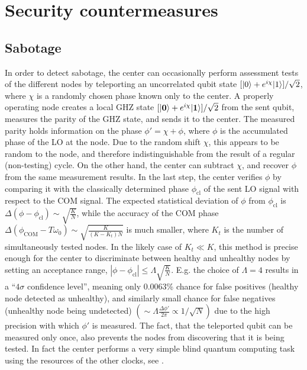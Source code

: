 




\section{Security countermeasures}
\label{app:Security_countermeasures}

\subsection{Sabotage}
In order to detect sabotage, the center can occasionally perform assessment
tests of the different nodes by teleporting an uncorrelated qubit state $[| 0 \rangle +
e^{i\chi}| 1 \rangle]/\sqrt{2}$, where $\chi$ is a
 randomly chosen phase known only to the center.
A properly operating node creates a local GHZ state $[| \mathbf{0} \rangle +
e^{i\chi}| \mathbf{1} \rangle]/\sqrt{2}$ from the sent qubit,
 measures the parity of the GHZ state, and sends it to the center. The
measured parity holds information on the phase $\phi' = \chi + \phi$, where
$\phi$ is the accumulated phase of the LO at the node. Due to the random shift
$\chi$, this appears to be random to the node, and therefore indistinguishable
from the result of a regular (non-testing) cycle. On the other hand, the center
can subtract $\chi$, and recover $\phi$ from the same measurement results. In
the last step, the center verifies $\phi$ by comparing it with the classically
determined phase $\phi_\mathrm{cl}$ of the sent LO signal with respect to the COM
signal. The expected statistical deviation of
$\phi$ from $\phi_\mathrm{cl}$ is $\Delta(\phi -
\phi_\mathrm{cl})\sim\sqrt{\frac{K}{N}}$, while the accuracy of the COM phase
$\Delta(\phi_\mathrm{COM} - T\omega_0)\sim\sqrt{\frac{K}{(K-K_t)N}}$ is much
smaller, where $K_t$ is the number of simultaneously tested nodes. In the likely
case of $K_t \ll K$, this method is precise enough for the center to
discriminate between healthy and unhealthy nodes by setting an acceptance range,
$|\phi - \phi_\mathrm{cl}| \leq \Lambda \sqrt{\frac{K}{N}}$. E.g. the choice of
$\Lambda = 4$ results in a ``$4\sigma$ confidence level'', meaning only 0.0063\%
chance for false positives (healthy node detected as unhealthy), and similarly
small chance for false negatives (unhealthy node being undetected)
$(\sim\Lambda\frac{\Delta \phi'}{2\pi}\propto 1/\sqrt{N}) $ due to the high
precision with which $\phi'$ is measured.
The fact, that the teleported qubit can be measured only once, also prevents the
nodes from discovering that it is being tested. In fact the
center performs a very simple blind quantum computing task using the resources
of the other clocks, see \cite{Childs2001, Broadbent2009, Mantri2013}.

